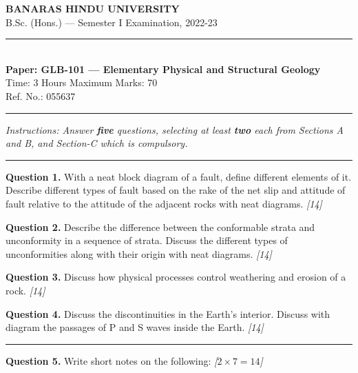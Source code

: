 \documentclass[11pt,a4paper]{article}
\newcommand{\pts}[1]{\hfill   \textit{[#1]}}
\begin{document}
\begin{center}
  {\large\bfseries BANARAS HINDU UNIVERSITY}\\[2pt]
  {\normalsize B.Sc. (Hons.) --- Semester I Examination, 2022-23}\\[6pt]
  \rule{0.8\linewidth}{0.5pt}\\[6pt]
  {\large\bfseries Paper: GLB-101 --- Elementary Physical and Structural Geology}\\[4pt]
  {\normalsize Time: 3 Hours \hfill Maximum Marks: 70}\\[2pt]
  {\small Ref. No.: 055637}
\end{center}
\rule{\linewidth}{0.4pt}
\smallskip



\noindent   \textit{Instructions: Answer   \textbf{five} questions, selecting at least   \textbf{two} each from Sections A and B, and Section-C which is compulsory.}
\bigskip

\bigskip


\rule{\linewidth}{0.4pt}\smallskip




\noindent   \textbf{Question 1.} With a neat block diagram of a fault, define different elements of it. Describe different types of fault based on the rake of the net slip and attitude of fault relative to the attitude of the adjacent rocks with neat diagrams. \pts{14}

\medskip


\noindent   \textbf{Question 2.} Describe the difference between the conformable strata and unconformity in a sequence of strata. Discuss the different types of unconformities along with their origin with neat diagrams. \pts{14}

\medskip


\noindent   \textbf{Question 3.} Discuss how physical processes control weathering and erosion of a rock. \pts{14}

\medskip


\noindent   \textbf{Question 4.} Discuss the discontinuities in the Earth's interior. Discuss with diagram the passages of P and S waves inside the Earth. \pts{14}

\bigskip


\rule{\linewidth}{0.4pt}\smallskip




\noindent   \textbf{Question 5.} Write short notes on the following: \pts{$2  \times 7 = 14$}
\end{document}
